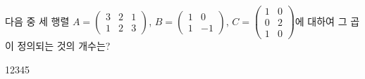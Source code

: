 \hspace*{2mm}\begin{minipage}[t]{\dimexpr\linewidth-2mm\relax}\vspace{0pt}
다음 중 세 행렬 $A=\begin{pmatrix} 3 & 2 & 1 \\ 1 & 2 & 3 \end{pmatrix}$, $B=\begin{pmatrix} 1 & 0 \\ 1 & -1 \end{pmatrix}$, $C=\begin{pmatrix} 1 & 0 \\ 0 & 2 \\ 1 & 0 \end{pmatrix}$에 대하여 그 곱이 정의되는 것의 개수는? 
\begin{choices32}{1}{2}{3}{4}{5}\end{choices32}\end{minipage}
